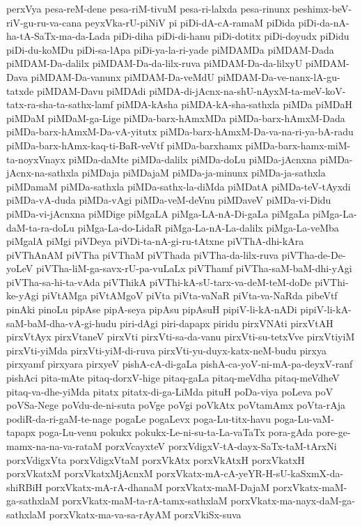 {perxVya
pesa-reM-dene
pesa-riM-tivuM
pesa-ri-lalxda
pesa-rinunx
peshimx-beV-riV-gu-ru-va-cana
peyxVka-rU-piNiV
pi
piDi-dA-cA-ramaM
piDida
piDi-da-nA-ha-tA-SaTx-ma-da-Lada
piDi-diha
piDi-di-hanu
piDi-dotitx
piDi-doyudx
piDidu
piDi-du-koMDu
piDi-sa-lApa
piDi-ya-la-ri-yade
piMDAMDa
piMDAM-Dada
piMDAM-Da-dalilx
piMDAM-Da-da-lilx-ruva
piMDAM-Da-da-lilxyU
piMDAM-Dava
piMDAM-Da-vanunx
piMDAM-Da-veMdU
piMDAM-Da-ve-nanx-lA-gu-tatxde
piMDAM-Davu
piMDAdi
piMDA-di-jAcnx-na-shU-nAyxM-ta-meV-koV-tatx-ra-sha-ta-sathx-lamf
piMDA-kAsha
piMDA-kA-sha-sathxla
piMDa
piMDaH
piMDaM
piMDaM-ga-Lige
piMDa-barx-hAmxMDa
piMDa-barx-hAmxM-Dada
piMDa-barx-hAmxM-Da-vA-yitutx
piMDa-barx-hAmxM-Da-va-na-ri-ya-bA-radu
piMDa-barx-hAmx-kaq-ti-BaR-veVtf
piMDa-barxhamx
piMDa-barx-hamx-miM-ta-noyxVnayx
piMDa-daMte
piMDa-dalilx
piMDa-doLu
piMDa-jAcnxna
piMDa-jAcnx-na-sathxla
piMDaja
piMDajaM
piMDa-ja-minunx
piMDa-ja-sathxla
piMDamaM
piMDa-sathxla
piMDa-sathx-la-diMda
piMDatA
piMDa-teV-tAyxdi
piMDa-vA-duda
piMDa-vAgi
piMDa-veM-deVnu
piMDaveV
piMDa-vi-Didu
piMDa-vi-jAcnxna
piMDige
piMgaLA
piMga-LA-nA-Di-gaLa
piMgaLa
piMga-La-daM-ta-ra-doLu
piMga-La-do-LidaR
piMga-La-nA-La-dalilx
piMga-La-veMba
piMgalA
piMgi
piVDeya
piVDi-ta-nA-gi-ru-tAtxne
piVThA-dhi-kAra
piVThAnAM
piVTha
piVThaM
piVThada
piVTha-da-lilx-ruva
piVTha-de-De-yoLeV
piVTha-liM-ga-savx-rU-pa-vuLaLx
piVThamf
piVTha-saM-baM-dhi-yAgi
piVTha-sa-hi-ta-vAda
piVThikA
piVThi-kA-sU-tarx-va-deM-teM-doDe
piVThi-ke-yAgi
piVtAMga
piVtAMgoV
piVta
piVta-vaNaR
piVta-va-NaRda
pibeVtf
pinAki
pinoLu
pipAse
pipA-seya
pipAsu
pipAsuH
pipiV-li-kA-nADi
pipiV-li-kA-saM-baM-dha-vA-gi-hudu
piri-dAgi
piri-dapapx
piridu
pirxVNAti
pirxVtAH
pirxVtAyx
pirxVtaneV
pirxVti
pirxVti-sa-da-vanu
pirxVti-su-tetxVve
pirxVtiyiM
pirxVti-yiMda
pirxVti-yiM-di-ruva
pirxVti-yu-duyx-katx-neM-budu
pirxya
pirxyamf
pirxyara
pirxyeV
pishA-cA-di-gaLa
pishA-ca-yoV-ni-mA-pa-deyxV-ranf
pishAci
pita-mAte
pitaq-dorxV-hige
pitaq-gaLa
pitaq-meVdha
pitaq-meVdheV
pitaq-va-dhe-yiMda
pitatx
pitatx-di-ga-LiMda
pituH
poDa-viya
poLeva
poV
poVSa-Nege
poVdu-de-ni-suta
poVge
poVgi
poVkAtx
poVtamAmx
poVta-rAja
podiR-da-ri-gaM-te-nage
pogaLe
pogaLevx
poga-Lu-titx-havu
poga-Lu-vaM-tapapx
poga-Lu-venu
pokukx
pokukx-Le-ni-su-ta-La-vaTaTx
pora-gAda
pore-ge-mamx-na-na-va-rataM
porxVcayxteV
porxVdigxV-tA-dayx-SaTx-taM-tArxNi
porxVdigxVta
porxVdigxVtaM
porxVkAtx
porxVkAtxH
porxVkatxH
porxVkatxM
porxVkatxMjAcnxM
porxVkatx-mA-cA-yeYR-H-sU-kaSxmX-da-shiRBiH
porxVkatx-mA-rA-dhanaM
porxVkatx-maM-DajaM
porxVkatx-maM-ga-sathxlaM
porxVkatx-maM-ta-rA-tamx-sathxlaM
porxVkatx-ma-nayx-daM-ga-sathxlaM
porxVkatx-ma-va-sa-rAyAM
porxVkiSx-suva
}
